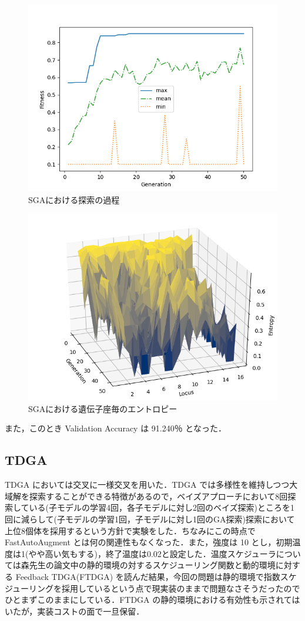 \documentclass[onecolumn]{ujarticle}   %
\begin{document}
  \begin{figure}[h]
		\begin{center}
			\includegraphics[width=0.7\columnwidth]{stats_SGA.png}
			\caption{SGAにおける探索の過程}
			\label{fig:SGA_stats}
		\end{center}
	\end{figure}

  \begin{figure}[h]
		\begin{center}
			\includegraphics[width=0.7\columnwidth]{entropy_SGA.png}
			\caption{SGAにおける遺伝子座毎のエントロピー}
			\label{fig:SGA_entropy}
		\end{center}
	\end{figure}

  また，このとき Validation Accuracy は 91.240％ となった．

  \subsection{TDGA}
  TDGA においては交叉に一様交叉を用いた．TDGA では多様性を維持しつつ大域解を探索することができる特徴があるので，ベイズアプローチにおいて8回探索している(子モデルの学習4回，各子モデルに対し2回のベイズ探索)ところを1回に減らして(子モデルの学習1回，子モデルに対し1回のGA探索)探索において上位8個体を採用するという方針で実験をした．ちなみにこの時点で FastAutoAugment とは何の関連性もなくなった．また，強度は 10 とし，初期温度は1(やや高い気もする)，終了温度は0.02と設定した．温度スケジューラについては森先生の論文中の静的環境の対するスケジューリング関数と動的環境に対する Feedback TDGA(FTDGA) を読んだ結果，今回の問題は静的環境で指数スケジューリングを採用しているという点で現実装のままで問題なさそうだったのでひとまずこのままにしている．FTDGA の静的環境における有効性も示されてはいたが，実装コストの面で一旦保留．
\end{document}
